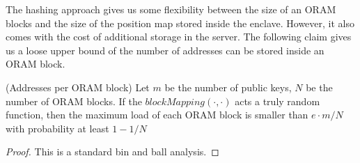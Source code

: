 The hashing approach gives us some flexibility between the size of an ORAM blocks and the size of the position map stored inside the enclave. However, it also comes with the cost of additional storage in the server. The following claim gives us a loose upper bound of the number of addresses can be stored inside an ORAM block.
\begin{claim}(Addresses per ORAM block)\label{claim:addressesperoramblock}
	Let $m$ be the number of public keys,  $N$ be the number of ORAM blocks. If the $blockMapping(\cdot,\cdot)$ acts a truly random function, then the maximum load of each ORAM block is smaller than $e\cdot m/N$ with probability at least $1 - 1/N$
\end{claim}
\begin{newtext}
\begin{proof}
	This is a standard bin and ball analysis.
\end{proof}
\end{newtext}

